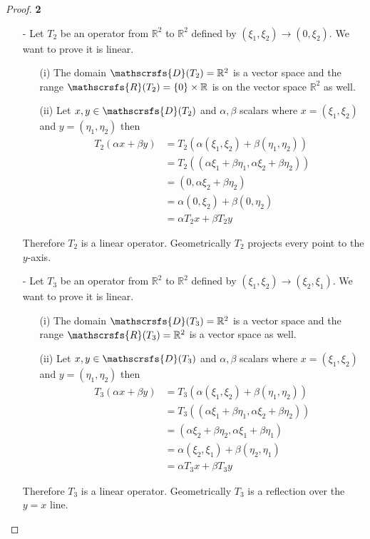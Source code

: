 \documentclass[11pt]{article}
\newcommand{\R}{\mathbb{R}}
\newcommand{\dom}{\mathscrsfs{D}}
\theoremstyle{definition}
\begin{document}
\begin{proof}{\textbf{2}}
\begin{itemize}
    \item[-]
    Let $T_2$ be an operator from $\R^2$ to $\R^2$ defined by
    $(\xi_1, \xi_2) \to (0, \xi_2)$. We want to prove it is linear.
    \begin{itemize}
        \item [(i)] The domain $\mathscrsfs{D}(T_2) = \R^2$ is a vector space
        and the range $\mathscrsfs{R}(T_2) = \{0\} \times \R$ is on the
        vector space $\R^2$ as well.
        \item [(ii)] Let $x,y \in \dom(T_2)$ and $\alpha,\beta$ scalars
        where $x = (\xi_1, \xi_2)$ and $y = (\eta_1, \eta_2)$ then
        \begin{align*}
            T_2(\alpha x + \beta y)
            &= T_2(\alpha(\xi_1, \xi_2) + \beta(\eta_1, \eta_2))\\
            &= T_2((\alpha\xi_1 + \beta\eta_1, \alpha\xi_2 + \beta\eta_2))\\
            &= (0, \alpha\xi_2 + \beta\eta_2)\\
            &= \alpha(0, \xi_2) + \beta(0, \eta_2)\\
            &= \alpha T_2x + \beta T_2y
        \end{align*}
    \end{itemize}
    Therefore $T_2$ is a linear operator. Geometrically $T_2$ projects every
    point to the $y$-axis.
\cleardoublepage
    \item[-]
    Let $T_3$ be an operator from $\R^2$ to $\R^2$ defined by
    $(\xi_1, \xi_2) \to (\xi_2, \xi_1)$. We want to prove it is linear.
    \begin{itemize}
        \item [(i)] The domain $\mathscrsfs{D}(T_3) = \R^2$ is a vector space
        and the range $\mathscrsfs{R}(T_3) = \R^2$ is a vector space as well.
        \item [(ii)] Let $x,y \in \dom(T_3)$ and $\alpha,\beta$ scalars
        where $x = (\xi_1, \xi_2)$ and $y = (\eta_1, \eta_2)$ then
        \begin{align*}
            T_3(\alpha x + \beta y)
            &= T_3(\alpha(\xi_1, \xi_2) + \beta(\eta_1, \eta_2))\\
            &= T_3((\alpha\xi_1 + \beta\eta_1, \alpha\xi_2 + \beta\eta_2))\\
            &= (\alpha\xi_2 + \beta\eta_2, \alpha\xi_1 + \beta\eta_1)\\
            &= \alpha(\xi_2, \xi_1) + \beta(\eta_2, \eta_1)\\
            &= \alpha T_3x + \beta T_3y
        \end{align*}
    \end{itemize}
    Therefore $T_3$ is a linear operator. Geometrically $T_3$ is a reflection
    over the $y=x$ line.


\end{itemize}
\end{proof}
\end{document}
